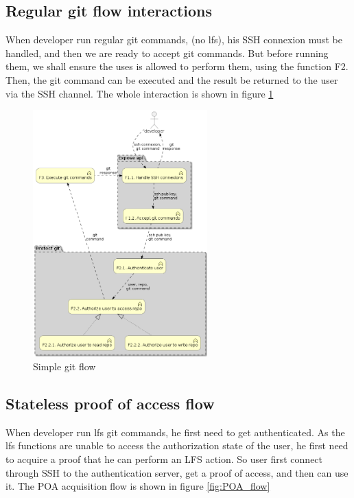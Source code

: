 \newpage
\subsection{Regular git flow interactions}

When developer run regular git commands, (no lfs), his SSH connexion must be handled, and then we are ready to accept git commands. But before running them, we shall ensure the uses is allowed to perform them, using the function F2. Then, the git command can be executed and the result be returned to the user via the SSH channel. The whole interaction is shown in figure \ref{fig:simple_git_flow}

\begin{figure}[ht]
    \centering
    \includegraphics[width=0.6\textwidth]{iteration_01/diagrams/simple_git_flow.png}
    \caption{Simple git flow}
    \label{fig:simple_git_flow}
\end{figure}

\newpage
\subsection{Stateless proof of access flow}

When developer run lfs git commands, he first need to get authenticated. As the lfs functions are unable to access the authorization state of the user, he first need to acquire a proof that he can perform an LFS action. So user first connect through SSH to the authentication server, get a proof of access, and then can use it. The POA acquisition flow is shown in figure \ref{fig:POA_flow}

